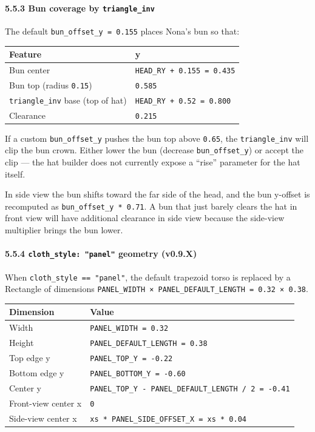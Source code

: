\documentclass[
  12pt,
  letterpaper,
]{book}
\begin{document}
\paragraph{\texorpdfstring{5.5.3 Bun coverage by
\texttt{triangle\_inv}}{5.5.3 Bun coverage by triangle\_inv}}\label{bun-coverage-by-triangle_inv}

The default \texttt{bun\_offset\_y\ =\ 0.155} places Nona's bun so that:

\begin{longtable}[]{@{}ll@{}}
\toprule\noalign{}
Feature & y \\
\midrule\noalign{}
\endhead
\bottomrule\noalign{}
\endlastfoot
Bun center & \texttt{HEAD\_RY\ +\ 0.155\ =\ 0.435} \\
Bun top (radius \texttt{0.15}) & \texttt{0.585} \\
\texttt{triangle\_inv} base (top of hat) &
\texttt{HEAD\_RY\ +\ 0.52\ =\ 0.800} \\
Clearance & \texttt{0.215} \\
\end{longtable}

If a custom \texttt{bun\_offset\_y} pushes the bun top above
\texttt{0.65}, the \texttt{triangle\_inv} will clip the bun crown.
Either lower the bun (decrease \texttt{bun\_offset\_y}) or accept the
clip --- the hat builder does not currently expose a ``rise'' parameter
for the hat itself.

In side view the bun shifts toward the far side of the head, and the bun
y-offset is recomputed as \texttt{bun\_offset\_y\ *\ 0.71}. A bun that
just barely clears the hat in front view will have additional clearance
in side view because the side-view multiplier brings the bun lower.

\paragraph{\texorpdfstring{5.5.4 \texttt{cloth\_style:\ "panel"}
geometry
(v0.9.X)}{5.5.4 cloth\_style: "panel" geometry (v0.9.X)}}\label{cloth_style-panel-geometry-v0.9.x}

When \texttt{cloth\_style\ ==\ "panel"}, the default trapezoid torso is
replaced by a Rectangle of dimensions
\texttt{PANEL\_WIDTH\ ×\ PANEL\_DEFAULT\_LENGTH\ =\ 0.32\ ×\ 0.38}.

\begin{longtable}[]{@{}ll@{}}
\toprule\noalign{}
Dimension & Value \\
\midrule\noalign{}
\endhead
\bottomrule\noalign{}
\endlastfoot
Width & \texttt{PANEL\_WIDTH\ =\ 0.32} \\
Height & \texttt{PANEL\_DEFAULT\_LENGTH\ =\ 0.38} \\
Top edge y & \texttt{PANEL\_TOP\_Y\ =\ -0.22} \\
Bottom edge y & \texttt{PANEL\_BOTTOM\_Y\ =\ -0.60} \\
Center y &
\texttt{PANEL\_TOP\_Y\ -\ PANEL\_DEFAULT\_LENGTH\ /\ 2\ =\ -0.41} \\
Front-view center x & \texttt{0} \\
Side-view center x &
\texttt{xs\ *\ PANEL\_SIDE\_OFFSET\_X\ =\ xs\ *\ 0.04} \\
\end{longtable}
\end{document}

